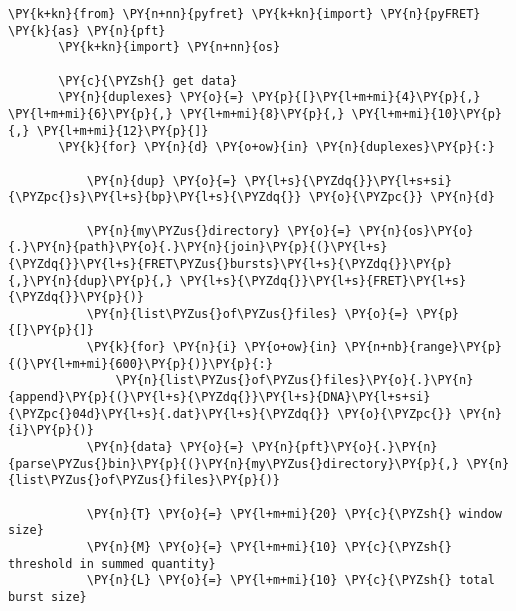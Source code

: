 \begin{Verbatim}[commandchars=\\\{\}, fontsize=\scriptsize]
       \PY{k+kn}{from} \PY{n+nn}{pyfret} \PY{k+kn}{import} \PY{n}{pyFRET} \PY{k}{as} \PY{n}{pft}
       \PY{k+kn}{import} \PY{n+nn}{os}
       
       \PY{c}{\PYZsh{} get data}
       \PY{n}{duplexes} \PY{o}{=} \PY{p}{[}\PY{l+m+mi}{4}\PY{p}{,} \PY{l+m+mi}{6}\PY{p}{,} \PY{l+m+mi}{8}\PY{p}{,} \PY{l+m+mi}{10}\PY{p}{,} \PY{l+m+mi}{12}\PY{p}{]}
       \PY{k}{for} \PY{n}{d} \PY{o+ow}{in} \PY{n}{duplexes}\PY{p}{:}
       
           \PY{n}{dup} \PY{o}{=} \PY{l+s}{\PYZdq{}}\PY{l+s+si}{\PYZpc{}s}\PY{l+s}{bp}\PY{l+s}{\PYZdq{}} \PY{o}{\PYZpc{}} \PY{n}{d}
           
           \PY{n}{my\PYZus{}directory} \PY{o}{=} \PY{n}{os}\PY{o}{.}\PY{n}{path}\PY{o}{.}\PY{n}{join}\PY{p}{(}\PY{l+s}{\PYZdq{}}\PY{l+s}{FRET\PYZus{}bursts}\PY{l+s}{\PYZdq{}}\PY{p}{,}\PY{n}{dup}\PY{p}{,} \PY{l+s}{\PYZdq{}}\PY{l+s}{FRET}\PY{l+s}{\PYZdq{}}\PY{p}{)}
           \PY{n}{list\PYZus{}of\PYZus{}files} \PY{o}{=} \PY{p}{[}\PY{p}{]}
           \PY{k}{for} \PY{n}{i} \PY{o+ow}{in} \PY{n+nb}{range}\PY{p}{(}\PY{l+m+mi}{600}\PY{p}{)}\PY{p}{:}
               \PY{n}{list\PYZus{}of\PYZus{}files}\PY{o}{.}\PY{n}{append}\PY{p}{(}\PY{l+s}{\PYZdq{}}\PY{l+s}{DNA}\PY{l+s+si}{\PYZpc{}04d}\PY{l+s}{.dat}\PY{l+s}{\PYZdq{}} \PY{o}{\PYZpc{}} \PY{n}{i}\PY{p}{)}
           \PY{n}{data} \PY{o}{=} \PY{n}{pft}\PY{o}{.}\PY{n}{parse\PYZus{}bin}\PY{p}{(}\PY{n}{my\PYZus{}directory}\PY{p}{,} \PY{n}{list\PYZus{}of\PYZus{}files}\PY{p}{)}
       
           \PY{n}{T} \PY{o}{=} \PY{l+m+mi}{20} \PY{c}{\PYZsh{} window size}
           \PY{n}{M} \PY{o}{=} \PY{l+m+mi}{10} \PY{c}{\PYZsh{} threshold in summed quantity}
           \PY{n}{L} \PY{o}{=} \PY{l+m+mi}{10} \PY{c}{\PYZsh{} total burst size}
       

\end{Verbatim}
